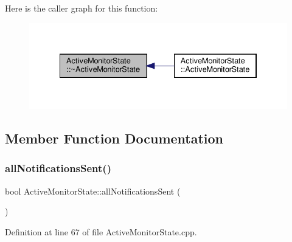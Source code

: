 Here is the caller graph for this function\+:\nopagebreak
\begin{figure}[H]
\begin{center}
\leavevmode
\includegraphics[width=334pt]{d9/db8/class_active_monitor_state_accb86642ec52bae9aacd2aa4e9ff4410_icgraph}
\end{center}
\end{figure}


\subsection{Member Function Documentation}
\mbox{\label{class_active_monitor_state_add557ab0dd0774482c08c982b82395e7}} 
\subsubsection{\texorpdfstring{all\+Notifications\+Sent()}{allNotificationsSent()}}
{\footnotesize\ttfamily bool Active\+Monitor\+State\+::all\+Notifications\+Sent (\begin{DoxyParamCaption}{ }\end{DoxyParamCaption})\hspace{0.3cm}{\ttfamily [private]}}



Definition at line 67 of file Active\+Monitor\+State.\+cpp.


